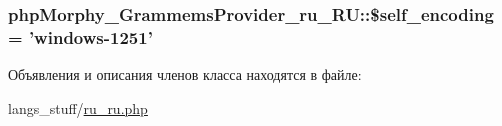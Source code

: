 \hypertarget{classphpMorphy__GrammemsProvider__ru__RU_a137fa080ffa6a569a1a28c16c721a7f9}{
\subsubsection[{\$self\_\-encoding}]{\setlength{\rightskip}{0pt plus 5cm}phpMorphy\_\-GrammemsProvider\_\-ru\_\-RU::\$self\_\-encoding = 'windows-\/1251'}}
\label{classphpMorphy__GrammemsProvider__ru__RU_a137fa080ffa6a569a1a28c16c721a7f9}


Объявления и описания членов класса находятся в файле:\begin{DoxyCompactItemize}
\item 
langs\_\-stuff/\hyperlink{ru__ru_8php}{ru\_\-ru.php}\end{DoxyCompactItemize}
